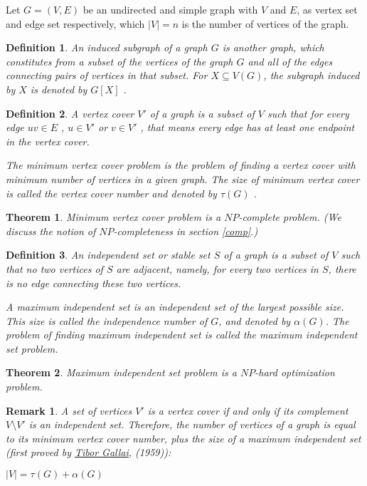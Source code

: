 \documentclass[12pt]{article}
\theoremstyle{slplain}
\newtheorem{theorem}{Theorem}
\newtheorem{defi}{Definition}
\newtheorem{rema}{Remark}
\begin{document}
Let $G = (V, E)$ be an undirected and simple graph with $V$ and $E$, as vertex set and edge set respectively, which $|V| = n$ is the number of vertices of the graph.



\begin{defi}
An induced subgraph of a graph $G$ is another graph, which constitutes from a subset of the vertices of the graph $G$ and all of the edges connecting pairs of vertices in that subset. For $X \subseteq V(G)$, the subgraph induced by $X$ is denoted by $G[X]$ .
\end{defi}


\begin{defi}
A vertex cover $V'$ of a graph is a subset of $V$ such that for every edge $uv \in E$ , $u \in V'$ or $v \in V'$ , that means every edge has at least one endpoint in the vertex cover. 

The minimum vertex cover problem is the problem of finding a vertex  cover with minimum number of vertices in a given graph. The size of minimum vertex cover is called the vertex cover number and denoted by $\tau(G)$ .
\end{defi}

\begin{theorem}
Minimum vertex cover problem is a $NP$-complete problem.\cite{cormen} (We discuss the notion of $NP$-completeness in section \ref{comp}.) 
\end{theorem}

\begin{defi}
An independent set or stable set $S$ of a graph is a subset
of $V$ such that no two vertices of $S$ are adjacent, namely, for every two
vertices in $S$, there is no edge connecting these two vertices. 

A maximum independent set is an independent set of the largest possible size. This size is called the independence number of $G$, and denoted by $\alpha(G)$. The problem of finding maximum independent set is called the maximum independent set problem.
\end{defi}

\begin{theorem}	
Maximum independent set problem is a $NP$-hard optimization problem.\cite{karp}
\end{theorem}

\begin{rema}
A set of vertices $V'$ is a vertex cover if and only if its complement
$V \setminus V'$ is an independent set. Therefore, the number of vertices of a graph
is equal to its minimum vertex cover number, plus the size of a maximum
independent set (first proved by \href{https://en.wikipedia.org/wiki/Tibor_Gallai}{Tibor Gallai}, (1959)\cite{gallai}):

\vspace{0.5cm}
\begin{center}
$|V| = \tau(G) + \alpha(G)$
\end{center}
\end{rema}
\end{document}
